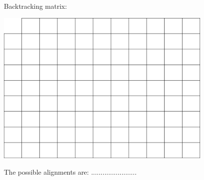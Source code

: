 \documentclass[a4paper,11pt]{article}
\begin{document}
Backtracking matrix:
\begin{center}
\includegraphics[width=0.8\textwidth]{matrix.png}
\end{center}
\vspace{0.5cm}

The possible alignments are: ........................
\end{document}
